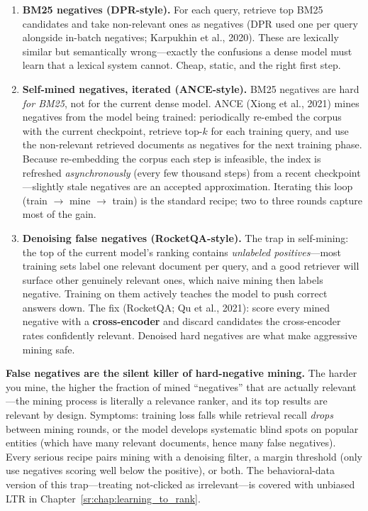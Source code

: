 \begin{enumerate}
    \item \textbf{BM25 negatives (DPR-style).} For each query, retrieve top BM25 candidates and take non-relevant ones as negatives (DPR used one per query alongside in-batch negatives; Karpukhin et al., 2020). These are lexically similar but semantically wrong---exactly the confusions a dense model must learn that a lexical system cannot. Cheap, static, and the right first step.
    \item \textbf{Self-mined negatives, iterated (ANCE-style).} BM25 negatives are hard \textit{for BM25}, not for the current dense model. ANCE (Xiong et al., 2021) mines negatives from the model being trained: periodically re-embed the corpus with the current checkpoint, retrieve top-$k$ for each training query, and use the non-relevant retrieved documents as negatives for the next training phase. Because re-embedding the corpus each step is infeasible, the index is refreshed \textit{asynchronously} (every few thousand steps) from a recent checkpoint---slightly stale negatives are an accepted approximation. Iterating this loop (train $\to$ mine $\to$ train) is the standard recipe; two to three rounds capture most of the gain.
    \item \textbf{Denoising false negatives (RocketQA-style).} The trap in self-mining: the top of the current model's ranking contains \textit{unlabeled positives}---most training sets label one relevant document per query, and a good retriever will surface other genuinely relevant ones, which naive mining then labels negative. Training on them actively teaches the model to push correct answers down. The fix (RocketQA; Qu et al., 2021): score every mined negative with a \textbf{cross-encoder} and discard candidates the cross-encoder rates confidently relevant. Denoised hard negatives are what make aggressive mining safe.
\end{enumerate}

\begin{warningbox}
\textbf{False negatives are the silent killer of hard-negative mining.} The harder you mine, the higher the fraction of mined ``negatives'' that are actually relevant---the mining process is literally a relevance ranker, and its top results are relevant by design. Symptoms: training loss falls while retrieval recall \textit{drops} between mining rounds, or the model develops systematic blind spots on popular entities (which have many relevant documents, hence many false negatives). Every serious recipe pairs mining with a denoising filter, a margin threshold (only use negatives scoring well below the positive), or both. The behavioral-data version of this trap---treating not-clicked as irrelevant---is covered with unbiased LTR in Chapter~\ref{sr:chap:learning_to_rank}.
\end{warningbox}

